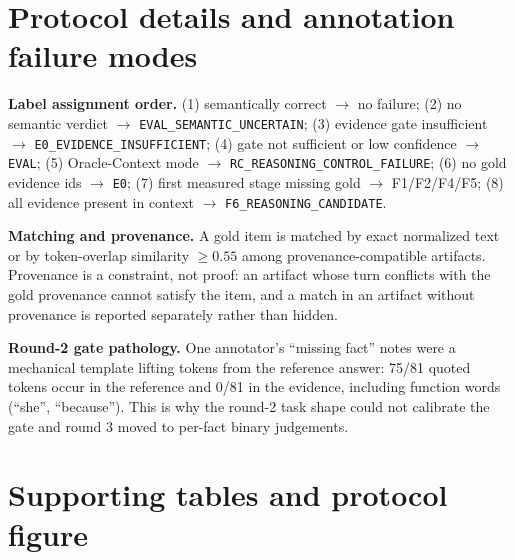 \documentclass[11pt]{article}
\begin{document}
\section{Protocol details and annotation failure modes}
\label{app:protocol}

\textbf{Label assignment order.} (1) semantically correct $\to$ no failure;
(2) no semantic verdict $\to$ \texttt{EVAL\_SEMANTIC\_UNCERTAIN}; (3) evidence
gate insufficient $\to$ \texttt{E0\_EVIDENCE\_INSUFFICIENT}; (4) gate not
sufficient or low confidence $\to$ \texttt{EVAL}; (5) Oracle-Context mode
$\to$ \texttt{RC\_REASONING\_CONTROL\_FAILURE}; (6) no gold evidence ids $\to$
\texttt{E0}; (7) first measured stage missing gold $\to$ F1/F2/F4/F5; (8) all
evidence present in context $\to$ \texttt{F6\_REASONING\_CANDIDATE}.

\textbf{Matching and provenance.} A gold item is matched by exact normalized
text or by token-overlap similarity $\geq 0.55$ among provenance-compatible
artifacts. Provenance is a constraint, not proof: an artifact whose turn
conflicts with the gold provenance cannot satisfy the item, and a match in an
artifact without provenance is reported separately rather than hidden.

\textbf{Round-2 gate pathology.} One annotator's ``missing fact'' notes were a
mechanical template lifting tokens from the reference answer: 75/81 quoted
tokens occur in the reference and 0/81 in the evidence, including function
words (``she'', ``because''). This is why the round-2 task shape could not
calibrate the gate and round 3 moved to per-fact binary judgements.


\section{Supporting tables and protocol figure}
\label{app:tables}
\end{document}
